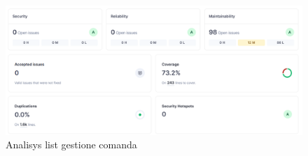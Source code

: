 \begin{figure}[htbp]
	\centering
	\includegraphics[scale=0.50]{iterazione1/images/Analisys_list_gestione_comanda.png}
	\caption{Analisys list gestione comanda\label{fig:Analisys list gestione comanda}}
\end{figure}

